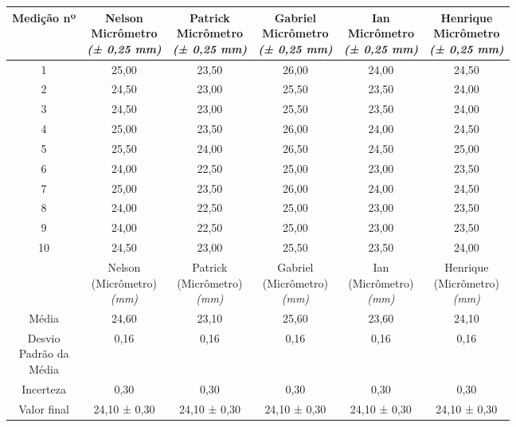 \documentclass{article}
\begin{document}
\begin{table}[h!]
\centering
\begin{tabular}{c c c c c c }
\toprule
Medição nº & \shortstack{Nelson\\Micrômetro\\\textit{(± 0,25 mm)}} & \shortstack{Patrick\\Micrômetro\\\textit{(± 0,25 mm)}} & \shortstack{Gabriel\\Micrômetro\\\textit{(± 0,25 mm)}} & \shortstack{Ian\\Micrômetro\\\textit{(± 0,25 mm)}} & \shortstack{Henrique\\Micrômetro\\\textit{(± 0,25 mm)}}\\
\midrule
1 & 25,00 & 23,50 & 26,00 & 24,00 & 24,50\\
2 & 24,50 & 23,00 & 25,50 & 23,50 & 24,00\\
3 & 24,50 & 23,00 & 25,50 & 23,50 & 24,00\\
4 & 25,00 & 23,50 & 26,00 & 24,00 & 24,50\\
5 & 25,50 & 24,00 & 26,50 & 24,50 & 25,00\\
6 & 24,00 & 22,50 & 25,00 & 23,00 & 23,50\\
7 & 25,00 & 23,50 & 26,00 & 24,00 & 24,50\\
8 & 24,00 & 22,50 & 25,00 & 23,00 & 23,50\\
9 & 24,00 & 22,50 & 25,00 & 23,00 & 23,50\\
10 & 24,50 & 23,00 & 25,50 & 23,50 & 24,00\\
\midrule
&\shortstack{Nelson\\(Micrômetro)\\\textit{(mm)}} & \shortstack{Patrick\\(Micrômetro)\\\textit{(mm)}} & \shortstack{Gabriel\\(Micrômetro)\\\textit{(mm)}} & \shortstack{Ian\\(Micrômetro)\\\textit{(mm)}} & \shortstack{Henrique\\(Micrômetro)\\\textit{(mm)}}\\
\midrule
Média & 24,60 & 23,10 & 25,60 & 23,60 & 24,10\\[3pt]
\shortstack{Desvio\\Padrão da\\Média} & 0,16 & 0,16 & 0,16 & 0,16 & 0,16\\[3pt]
Incerteza & 0,30 & 0,30 & 0,30 & 0,30 & 0,30\\[3pt]
Valor final & 24,10 ± 0,30 & 24,10 ± 0,30 & 24,10 ± 0,30 & 24,10 ± 0,30 & 24,10 ± 0,30\\[3pt]
\bottomrule
\end{tabular}
\end{table}
\end{document}
